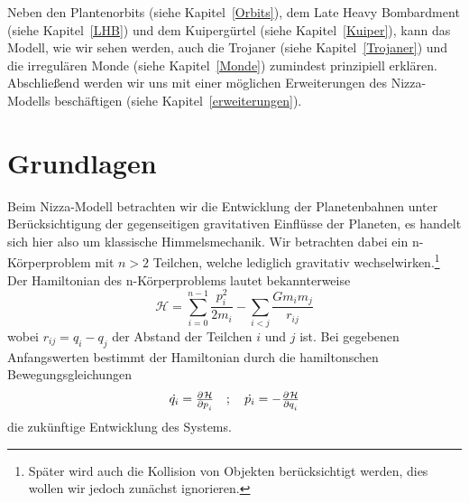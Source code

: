 \documentclass[12pt,a4paper,twoside]{article}
\newcommand{\refsec}[1]{siehe Kapitel~\ref{#1}}
\begin{document}
Neben den Plantenorbits (\refsec{Orbits}), dem Late Heavy Bombardment (\refsec{LHB}) und dem Kuipergürtel (\refsec{Kuiper}), kann das Modell, wie wir sehen werden, auch die Trojaner (\refsec{Trojaner}) und die irregulären Monde (\refsec{Monde}) zumindest prinzipiell erklären.
Abschließend werden wir uns mit einer möglichen Erweiterungen des Nizza-Modells beschäftigen (\refsec{erweiterungen}).

\FloatBarrier
\section{Grundlagen}
Beim Nizza-Modell betrachten wir die Entwicklung der Planetenbahnen unter Be\-rück\-sich\-ti\-gung der gegenseitigen gravitativen Einflüsse der Planeten, es handelt sich hier also um klassische Himmelsmechanik. %
Wir betrachten dabei ein n-Körperproblem mit $n>2$ Teilchen, welche lediglich gravitativ wechselwirken.\footnote{Später wird auch die Kollision von Objekten berücksichtigt werden, dies wollen wir jedoch zunächst ignorieren.}
Der Hamiltonian des n-Körperproblems lautet bekannterweise
\begin{equation}\label{eq:nbodyhamilton}
{\mathcal H} = \sum\limits_{i=0}^{n-1} \frac{p_i^2}{2m_i} - \sum\limits_{i<j} \frac{Gm_im_j}{r_{ij}}
\end{equation}
wobei $r_{ij}=q_i-q_j$ der Abstand der Teilchen $i$ und $j$ ist. %
Bei gegebenen Anfangswerten bestimmt der Hamiltonian durch die hamiltonschen Bewegungsgleichungen
\begin{equation}
\dot{q_i} = \pd{\mathcal H}{p_i} \quad ; \quad \dot{p_i} = - \pd{\mathcal H}{q_i}
\end{equation}
die zukünftige Entwicklung des Systems.
\end{document}
